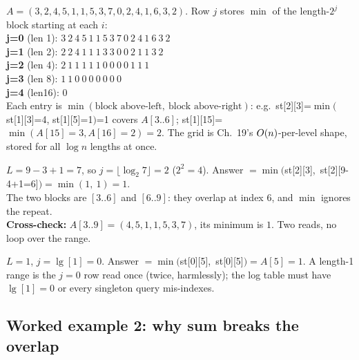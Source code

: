\begin{tracebox}
\(A=(3,2,4,5,1,1,5,3,7,0,2,4,1,6,3,2)\).  Row \(j\) stores \(\min\) of the length-\(2^j\) block starting at each \(i\):\\
\textbf{j=0} (len 1): \(3\ 2\ 4\ 5\ 1\ 1\ 5\ 3\ 7\ 0\ 2\ 4\ 1\ 6\ 3\ 2\)\\
\textbf{j=1} (len 2): \(2\ 2\ 4\ 1\ 1\ 1\ 3\ 3\ 0\ 0\ 2\ 1\ 1\ 3\ 2\)\\
\textbf{j=2} (len 4): \(2\ 1\ 1\ 1\ 1\ 1\ 0\ 0\ 0\ 0\ 1\ 1\ 1\)\\
\textbf{j=3} (len 8): \(1\ 1\ 0\ 0\ 0\ 0\ 0\ 0\ 0\)\\
\textbf{j=4} (len16): \(0\)\\
Each entry is \(\min(\text{block above-left},\ \text{block above-right})\): e.g.\ st[2][3]=\(\min(\)st[1][3]=4, st[1][5]=1\()\)=1 covers \(A[3..6]\); st[1][15]=\(\min(A[15]=3,A[16]=2)=2\).  The grid is Ch.~19's \(O(n)\)-per-level shape, stored for all \(\log n\) lengths at once.
\end{tracebox}

\begin{tracebox}
\(L=9-3+1=7\), so \(j=\lfloor\log_2 7\rfloor=2\) (\(2^2=4\)).  Answer
\(=\min(\)st[2][3],\ st[2][9-4+1=6]\()=\min(1,\ 1)=\boxed{1}\).\\
The two blocks are \([3..6]\) and \([6..9]\): they overlap at index \(6\), and \(\min\) ignores the repeat.\\
\textbf{Cross-check:} \(A[3..9]=(4,5,1,1,5,3,7)\), its minimum is \(1\).  Two reads, no loop over the range.
\end{tracebox}

\begin{tracebox}
\(L=1\), \(j=\lg[1]=0\).  Answer \(=\min(\)st[0][5],\ st[0][5]\()=A[5]=\boxed{1}\).  A length-1 range is the \(j=0\) row read once (twice, harmlessly); the log table must have \(\lg[1]=0\) or every singleton query mis-indexes.
\end{tracebox}

\subsection{Worked example 2: why sum breaks the overlap}

